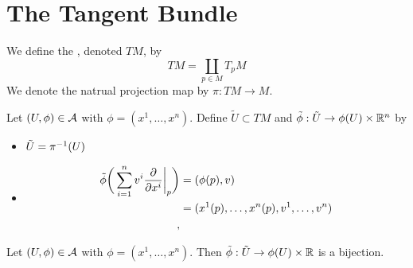 \documentclass{book}
\begin{document}
	
	
	
	
	
	
	
	
	
	
	
	
	
	
	
	
	
	
	
	
	
	
	
	
	
	
	
	
	
	
	\newpage
	\section{The Tangent Bundle}
	\begin{defn}
		We define the , denoted $TM$, by $$TM = \coprod_{p \in M} T_pM$$ 
		We denote the natrual projection map by $\pi: TM \rightarrow M$.
	\end{defn}
	
	\begin{defn}
		Let $(U, \phi) \in \mathcal{A}$ with $\phi = (x^1, \dots, x^n)$. Define $\tilde{U} \subset TM$ and $\tilde{\phi}: \tilde{U} \rightarrow \phi(U) \times \mathbb{R}^{n}$ by  
		\begin{itemize}
			\item $\tilde{U} = \pi^{-1}(U)$
			\item 
			\begin{align*}
				\tilde{\phi} \bigg(\sum\limits_{i =1}^n v^i \frac{\partial}{\partial x^i} \bigg|_p \bigg) 
				&= (\phi(p), v) \\
				&= (x^1(p), \dots, x^n(p), v^1, \dots, v^n) \\
, 			\end{align*}
		\end{itemize}
	\end{defn}

	\begin{ex}
		Let $(U, \phi) \in \mathcal{A}$ with $\phi = (x^1, \dots, x^n)$. Then $\tilde{\phi}:\tilde{U} \rightarrow \phi(U) \times \mathbb{R}$ is a bijection. 
	\end{ex}
\end{document}
